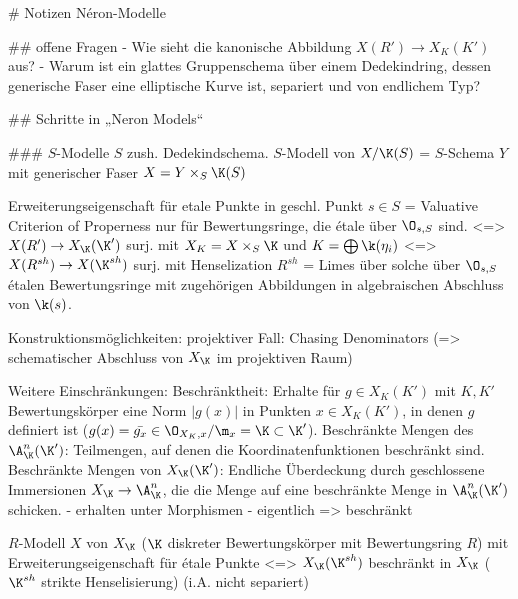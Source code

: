 # Notizen Néron-Modelle

## offene Fragen
- Wie sieht die kanonische Abbildung $X(R')\to X_K(K')$ aus?
- Warum ist ein glattes Gruppenschema über einem Dedekindring, dessen
generische Faser eine elliptische Kurve ist, separiert und von
endlichem Typ?

## Schritte in „Neron Models“

### $S$-Modelle 
$S$ zush. Dedekindschema.
$S$-Modell von $X/\K(S)$ = $S$-Schema $Y$ mit generischer Faser $X=Y \times_S \K(S)$

Erweiterungseigenschaft für etale Punkte in geschl. Punkt $s\in S$
= Valuative Criterion of Properness nur für Bewertungsringe, die étale
über $\O_{s,S}$ sind.
<=> $X(R') \to X_\K(\K')$ surj.
    mit $X_K=X \times_S \K$ und $K=\bigoplus \k(\eta_i)$
<=> $X(R^{sh}) \to X(\K^{sh})$ surj.
    mit Henselization $R^{sh}$ = Limes über solche über $\O_{s,S}$ étalen
    Bewertungsringe mit zugehörigen Abbildungen in algebraischen Abschluss
    von $\k(s)$.

Konstruktionsmöglichkeiten:
projektiver Fall: Chasing Denominators (=> schematischer Abschluss von
$X_\K$ im projektiven Raum)

Weitere Einschränkungen:
Beschränktheit: Erhalte für $g\in X_K(K')$ mit $K,K'$ Bewertungskörper
eine Norm $|g(x)|$ in Punkten $x\in X_K(K')$, in denen $g$ definiert
ist ($g(x)=\bar{g_x}\in \O_{X_K,x}/\m_x=\K\subset\K' $).
Beschränkte Mengen des $\A_\K^n(\K')$: Teilmengen, auf denen die
Koordinatenfunktionen beschränkt sind.
Beschränkte Mengen von $X_\K(\K')$: Endliche Überdeckung durch
geschlossene Immersionen $X_\K\to\A_\K^n$, die die Menge auf eine
beschränkte Menge in $\A_\K^n(\K')$ schicken.
- erhalten unter Morphismen
- eigentlich => beschränkt

$R$-Modell $X$ von $X_\K$ ($\K$ diskreter Bewertungskörper mit
Bewertungsring $R$) mit Erweiterungseigenschaft für étale Punkte
<=> $X_\K(\K^{sh})$ beschränkt in $X_\K$ ($\K^{sh}$ strikte
Henselisierung)
(i.A. nicht separiert)